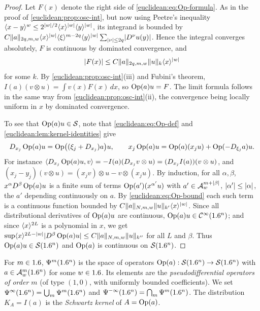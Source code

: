 \begin{proof}
  Let $F(x)$ denote the right side of \eqref{euclidean:eq:Op-formula}. As in
  the proof of \cref{euclidean:prop:osc-int}, but now using Peetre's
  inequality $\langle x-y\rangle^w\le2^{\lvert w\rvert/2}\langle x\rangle^{\lvert w\rvert}\langle y\rangle^{\lvert w\rvert}$, its
  integrand is bounded by
  $C\lVert a\rVert_{2q,m,w}\langle x\rangle^{\lvert w\rvert}\langle \xi\rangle^{m-2q}\langle y\rangle^{\lvert w\rvert}
  \sum_{\lvert \nu\rvert\le2q}\lvert D^\nu u(y)\rvert$. Hence the integral converges
  absolutely, $F$ is continuous by dominated convergence, and
  \begin{equation}\label{euclidean:eq:Op-bound}
    \lvert F(x)\rvert\le C\lVert a\rVert_{2q,m,w}\lVert u\rVert_k\langle x\rangle^{\lvert w\rvert}
  \end{equation}
  for some $k$. By \cref{euclidean:prop:osc-int}(iii) and Fubini's theorem,
  $I(a)(v\otimes u)=\int v(x)F(x)\,dx$, so $\operatorname{Op}(a)u=F$. The limit formula
  follows in the same way from \cref{euclidean:prop:osc-int}(ii), the
  convergence being locally uniform in $x$ by dominated convergence.

  To see that $\operatorname{Op}(a)u\in\mathcal{S}$, note that \eqref{euclidean:eq:Op-def} and
  \cref{euclidean:lem:kernel-identities} give
  \begin{equation*}
    D_{x_j}\operatorname{Op}(a)u=\operatorname{Op}\bigl((\xi_j+D_{x_j})a\bigr)u,\qquad
    x_j\operatorname{Op}(a)u=\operatorname{Op}(a)(x_ju)+\operatorname{Op}(-D_{\xi_j}a)u.
  \end{equation*}
  For instance
  $\langle D_{x_j}\operatorname{Op}(a)u, v\rangle=-I(a)(D_{x_j}v\otimes u)=(D_{x_j}I(a))(v\otimes u)$,
  and $(x_j-y_j)(v\otimes u)=(x_jv)\otimes u-v\otimes(x_ju)$. By induction,
  for all $\alpha,\beta$, $x^\alpha D^\beta\operatorname{Op}(a)u$ is a finite sum of terms
  $\operatorname{Op}(a')(x^{\alpha'}u)$ with $a'\in\mathcal{A}^{m+\lvert \beta\rvert}_{w}$, $\lvert \alpha'\rvert\le\lvert \alpha\rvert$,
  the $a'$ depending continuously on $a$. By \eqref{euclidean:eq:Op-bound}
  each such term is a continuous function bounded by
  $C\lVert a\rVert_{N,m,w}\lVert u\rVert_{k'}\langle x\rangle^{\lvert w\rvert}$. Since all distributional
  derivatives of $\operatorname{Op}(a)u$ are continuous, $\operatorname{Op}(a)u\in\mathcal{C}^\infty(1.6^n)$; and since
  $\langle x\rangle^{2L}$ is a polynomial in $x$, we get
  $\sup\langle x\rangle^{2L-\lvert w\rvert}\lvert D^\beta\operatorname{Op}(a)u\rvert\le C\lVert a\rVert_{N,m,w}\lVert u\rVert_{k''}$
  for all $L$ and $\beta$. Thus $\operatorname{Op}(a)u\in\mathcal{S}(1.6^n)$ and $\operatorname{Op}(a)$ is
  continuous on $\mathcal{S}(1.6^n)$.
\end{proof}

\begin{definition}\label{euclidean:def:psido}
  For $m\in1.6$, $\Psi^{m}(1.6^n)$ is the space of operators
  $\operatorname{Op}(a):\mathcal{S}(1.6^n)\to\mathcal{S}(1.6^n)$ with $a\in\mathcal{A}^{m}_{w}(1.6^n)$ for some $w\in1.6$.
  Its elements are the \emph{pseudodifferential operators of order $m$} (of
  type $(1,0)$, with uniformly bounded coefficients). We set
  $\Psi^{\infty}(1.6^n)=\bigcup_m\Psi^{m}(1.6^n)$ and
  $\Psi^{-\infty}(1.6^n)=\bigcap_m\Psi^{m}(1.6^n)$. The distribution
  $K_A=I(a)$ is the \emph{Schwartz kernel} of $A=\operatorname{Op}(a)$.
\end{definition}

